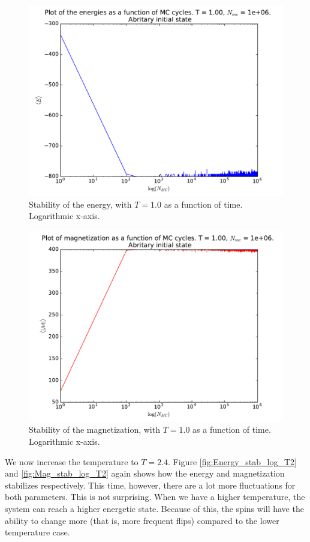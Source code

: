 \documentclass[12pt]{article}
\begin{document}
\begin{figure}[H]
\centering
\includegraphics[width=\linewidth]{Plots/Energy_stability_logarithmic_T1.pdf}
\caption{Stability of the energy, with $T = 1.0$ as a function of time. Logarithmic x-axis.}
\label{fig:Energy_stab_log_T1}
\end{figure}
\begin{figure}[H]
\centering
\includegraphics[width=\linewidth]{Plots/Magnetization_stability_logarithmic_T1.pdf}
\caption{Stability of the magnetization, with $T = 1.0$ as a function of time. Logarithmic x-axis.}
\label{fig:Mag_stab_log_T1}
\end{figure}

We now increase the temperature to $T = 2.4$. Figure \ref{fig:Energy_stab_log_T2} and \ref{fig:Mag_stab_log_T2} again shows how the energy and magnetization stabilizes respectively. This time, however, there are a lot more fluctuations for both parameters. This is not surprising. When we have a higher temperature, the system can reach a higher energetic state. Because of this, the spins will have the ability to change more (that is, more frequent flips) compared to the lower temperature case.
\end{document}
